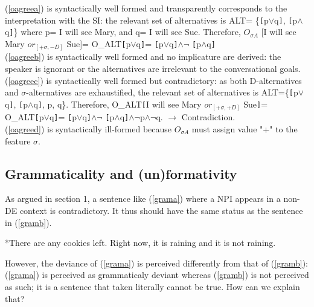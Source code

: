 \documentclass[a4paper,11pt]{article}
\newcommand{\reff}[1]{(\ref{#1})}
\begin{document}
\reff{oagreea} is syntactically well formed and transparently corresponds to the interpretation with the SI: the relevant set of alternatives is ALT= \{\verb![!p$\vee$q\verb!]!, \verb![!p$\wedge$q\verb!]!\} where p= I will see Mary, and q= I will see Sue. Therefore, $O_{\sigma A}$ [I will see Mary $or_{[+\sigma, -D]}$ Sue]= O_{ALT}\verb![!p$\vee$q\verb!]!= \verb![!p$\vee$q\verb!]!$\wedge\neg$ \verb![!p$\wedge$q\verb!]!
\\\reff{oagreeb} is syntactically well formed and no implicature  are derived: the speaker is ignorant or the alternatives are irrelevant to the conversational goals.
\\\reff{oagreec} is syntactically well formed but contradictory: as both D-alternatives and $\sigma$-alternatives are exhaustified, the relevant set of alternatives is ALT=\{\verb![!p$\vee$q\verb!]!, \verb![!p$\wedge$q\verb!]!, p, q\}. Therefore, O_{ALT}\verb![!I will see Mary $or_{[+\sigma,+D]}$ Sue\verb!]!= O_{ALT}\verb![!p$\vee$q\verb!]!= \verb![!p$\vee$q\verb!]!$\wedge\neg$ \verb![!p$\wedge$q\verb!]!$\wedge\neg$p$\wedge\neg$q. $\rightarrow$ Contradiction.
\\\reff{oagreed} is syntactically ill-formed because $O_{\sigma A}$  must assign value "+" to the feature $\sigma$.

\subsection{Grammaticality and (un)formativity}

 As argued in section 1, a sentence like \reff{grama} where a NPI appears in a non-DE context is contradictory. It thus should have the same status as the sentence in \reff{gramb}.
 \begin{exe}
 \ex\label{gram} \begin{xlist}
 \ex\label{grama} *There are any cookies left.
 \ex\label{gramb} Right now, it is raining and it is not raining.
 \end{xlist}
 \end{exe}
 However, the deviance of (\ref{grama}) is perceived differently from that of (\ref{gramb}): (\ref{grama}) is perceived as grammaticaly deviant whereas (\ref{gramb}) is not perceived as such; it is a sentence that taken literally cannot be true. How can we explain that?
\end{document}
